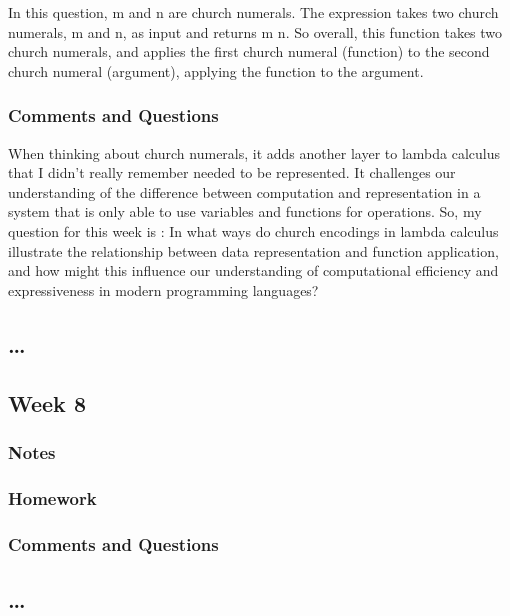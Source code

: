 \documentclass{article}
\theoremstyle{theorem}
\theoremstyle{definition}
\theoremstyle{remark}
\begin{document}
In this question, m and n are church numerals. The expression takes two church 
numerals, m and n, as input and returns m n. So overall, this function takes two church
numerals, and applies the first church numeral (function) to the second church numeral
(argument), applying the function to the argument.
\subsubsection*{Comments and Questions}
When thinking about church numerals, it adds another layer to lambda calculus that
I didn't really remember needed to be represented. It challenges our understanding of 
the difference between computation and representation in a system that is only able to 
use variables and functions for operations. So, my question for this week is :
In what ways do church encodings in lambda calculus illustrate the relationship between 
data representation and function application, and how might this influence our understanding
of computational efficiency and expressiveness in modern programming languages?
\subsection{\ldots}


\subsection{Week 8}
\subsubsection*{Notes}


\subsubsection*{Homework}

\subsubsection*{Comments and Questions}

\subsection{\ldots}



\end{document}
